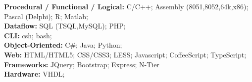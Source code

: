 

\begin{cvparagraph}
\textbf{Procedural / Functional / Logical:} C/C++; Assembly (8051,8052,64k,x86); Pascal (Delphi); R; Matlab;
\\
\textbf{Dataflow:}
SQL (TSQL,MySQL); PHP;
\\
\textbf{CLI:} csh; bash;
\\
\textbf{Object-Oriented:} C\#; Java; Python;
\\
\textbf{Web:} HTML/HTML5; CSS/CSS3; LESS; Javascript; CoffeeScript; TypeScript;
\\
\textbf{Frameworks:} JQuery; Bootstrap; Express; N-Tier 
\\
\textbf{Hardware:} VHDL;
\end{cvparagraph}
